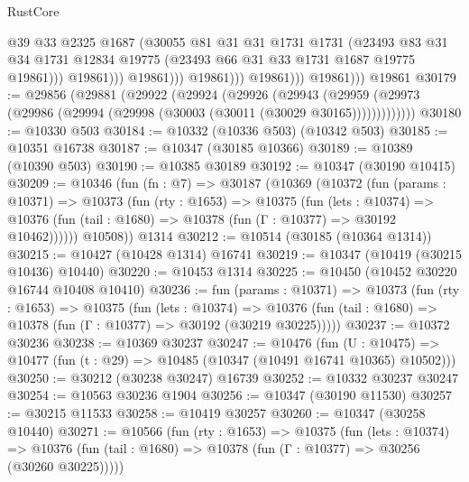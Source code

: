 \begin{lexlean}{RustCore}
\begin{coremodule}
                                  @39
                                  @33
                                  @2325
                                  @1687
                                  (@30055
                                    @81
                                    @31
                                    @31
                                    @1731
                                    @1731
                                    (@23493
                                      @83
                                      @31
                                      @34
                                      @1731
                                      @12834
                                      @19775
                                      (@23493 @66 @31 @33 @1731 @1687 @19775 @19861)))
                                  @19861)))
                            @19861)))
                      @19861)))
                @19861)))
          @19861)))
    @19861
@30179 := @29856
    (@29881
      (@29922
        (@29924
          (@29926
            (@29943
              (@29959 (@29973 (@29986 (@29994 (@29998 (@30003 (@30011 (@30029 @30165)))))))))))))
@30180 := @10330 @503
@30184 := @10332 (@10336 @503) (@10342 @503)
@30185 := @10351 @16738
@30187 := @10347 (@30185 @10366)
@30189 := @10389 (@10390 @503)
@30190 := @10385 @30189
@30192 := @10347 (@30190 @10415)
@30209 := @10346
    (fun (fn : @7) =>
    @30187
      (@10369
        (@10372
          (fun (params : @10371) =>
          @10373
            (fun (rty : @1653) =>
            @10375
              (fun (lets : @10374) =>
              @10376 (fun (tail : @1680) => @10378 (fun (Γ : @10377) => @30192 @10462))))))
        @10508))
    @1314
@30212 := @10514 (@30185 (@10364 @1314))
@30215 := @10427 (@10428 @1314) @16741
@30219 := @10347 (@10419 (@30215 @10436) @10440)
@30220 := @10453 @1314
@30225 := @10450 (@10452 @30220 @16744 @10408 @10410)
@30236 := fun (params : @10371) =>
  @10373
    (fun (rty : @1653) =>
    @10375
      (fun (lets : @10374) =>
      @10376 (fun (tail : @1680) => @10378 (fun (Γ : @10377) => @30192 (@30219 @30225)))))
@30237 := @10372 @30236
@30238 := @10369 @30237
@30247 := @10476
    (fun (U : @10475) => @10477 (fun (t : @29) => @10485 (@10347 (@10491 @16741 @10365) @10502)))
@30250 := @30212 (@30238 @30247) @16739
@30252 := @10332 @30237 @30247
@30254 := @10563 @30236 @1904
@30256 := @10347 (@30190 @11530)
@30257 := @30215 @11533
@30258 := @10419 @30257
@30260 := @10347 (@30258 @10440)
@30271 := @10566
    (fun (rty : @1653) =>
    @10375
      (fun (lets : @10374) =>
      @10376 (fun (tail : @1680) => @10378 (fun (Γ : @10377) => @30256 (@30260 @30225)))))

\end{coremodule}
\end{lexlean}
